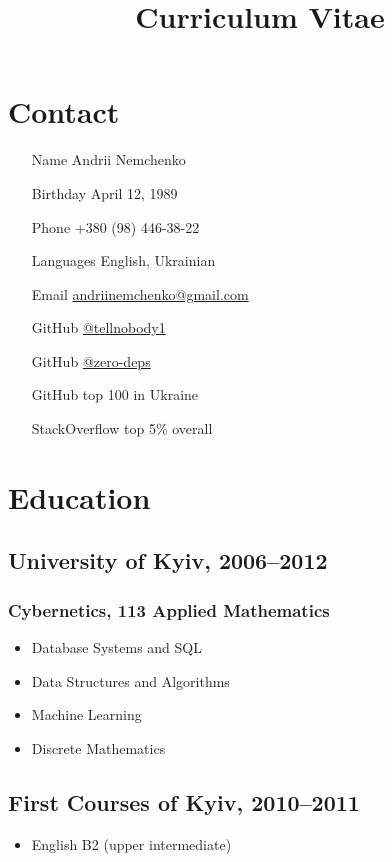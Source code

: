 


\title{Curriculum Vitae}
\author{}
\date{}
\maketitle

\section*{Contact}
\begin{itemize}
  \item[Name] Andrii Nemchenko
  \item[Birthday] April 12, 1989
  \item[Phone] +380 (98) 446-38-22
  \item[Languages] English, Ukrainian
  \item[Email] \href{mailto:andriinemchenko@gmail.com}{andriinemchenko@gmail.com}
  \item[GitHub] \href{https://github.com/tellnobody1}{@tellnobody1}
  \item[GitHub] \href{https://github.com/zero-deps}{@zero-deps}
  \item[GitHub] top 100 in Ukraine
  \item[StackOverflow] top 5\% overall
\end{itemize}

\section*{Education}

\subsection*{University of Kyiv, 2006–2012}
\subsubsection*{Cybernetics, 113 Applied Mathematics}
\begin{itemize}
  \item Database Systems and SQL
  \item Data Structures and Algorithms
  \item Machine Learning
  \item Discrete Mathematics
\end{itemize}

\subsection*{First Courses of Kyiv, 2010–2011}
\begin{itemize}
  \item English B2 (upper intermediate)
\end{itemize}

